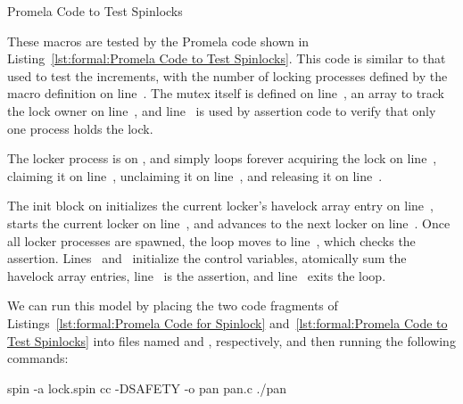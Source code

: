 \begin{listing}

\caption{Promela Code to Test Spinlocks}
\label{lst:formal:Promela Code to Test Spinlocks}
\end{listing}

\begin{fcvref}
These macros are tested by the Promela code shown in
Listing~\ref{lst:formal:Promela Code to Test Spinlocks}.
This code is similar to that used to test the increments,
with the number of locking processes defined by the 
macro definition on line~.
The mutex itself is defined on line~,
an array to track the lock owner
on line~, and line~ is used by assertion
code to verify that only one process holds the lock.
\end{fcvref}

\begin{fcvref}
The locker process is on , and simply loops forever
acquiring the lock on line~, claiming it on line~,
unclaiming it on line~, and releasing it on line~.
\end{fcvref}

\begin{fcvref}
The init block on  initializes the current locker's
havelock array entry on line~, starts the current locker on
line~, and advances to the next locker on line~.
Once all locker processes are spawned, the  loop
moves to line~, which checks the assertion.
Lines~ and~ initialize the control variables,
 atomically sum the havelock array entries,
line~ is the assertion, and line~ exits the loop.
\end{fcvref}

We can run this model by placing the two code fragments of
Listings~\ref{lst:formal:Promela Code for Spinlock}
and~\ref{lst:formal:Promela Code to Test Spinlocks} into
files named  and , respectively, and then running
the following commands:

\begin{VerbatimU}
spin -a lock.spin
cc -DSAFETY -o pan pan.c
./pan
\end{VerbatimU}

